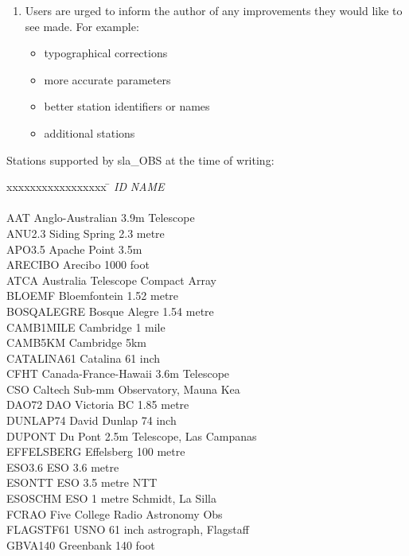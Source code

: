 \documentclass[11pt,twoside]{article}
\begin{document}
{\begin{enumerate}
  \item Users are urged to inform the author of any improvements
        they would like to see made.  For example:
        \begin{itemize}
         \item typographical corrections
         \item more accurate parameters
         \item better station identifiers or names
         \item additional stations
        \end{itemize}
 \end{enumerate}
Stations supported by sla\_OBS at the time of writing:
\begin{tabbing}
xxxxxxxxxxxxxxxxx \= \kill
{\it ID} \> {\it NAME} \\ \\
AAT \> Anglo-Australian 3.9m Telescope \\
ANU2.3 \> Siding Spring 2.3 metre \\
APO3.5 \> Apache Point 3.5m \\
ARECIBO \> Arecibo 1000 foot \\
ATCA \> Australia Telescope Compact Array \\
BLOEMF \> Bloemfontein 1.52 metre \\
BOSQALEGRE \> Bosque Alegre 1.54 metre \\
CAMB1MILE \> Cambridge 1 mile \\
CAMB5KM \> Cambridge 5km \\
CATALINA61 \> Catalina 61 inch \\
CFHT \> Canada-France-Hawaii 3.6m Telescope \\
CSO \> Caltech Sub-mm Observatory, Mauna Kea \\
DAO72 \> DAO Victoria BC 1.85 metre \\
DUNLAP74 \> David Dunlap 74 inch \\
DUPONT \> Du Pont 2.5m Telescope, Las Campanas \\
EFFELSBERG \> Effelsberg 100 metre \\
ESO3.6 \> ESO 3.6 metre \\
ESONTT \> ESO 3.5 metre NTT \\
ESOSCHM \> ESO 1 metre Schmidt, La Silla \\
FCRAO \> Five College Radio Astronomy Obs \\
FLAGSTF61 \> USNO 61 inch astrograph, Flagstaff \\
GBVA140 \> Greenbank 140 foot \\

\end{tabbing}}
\end{document}
